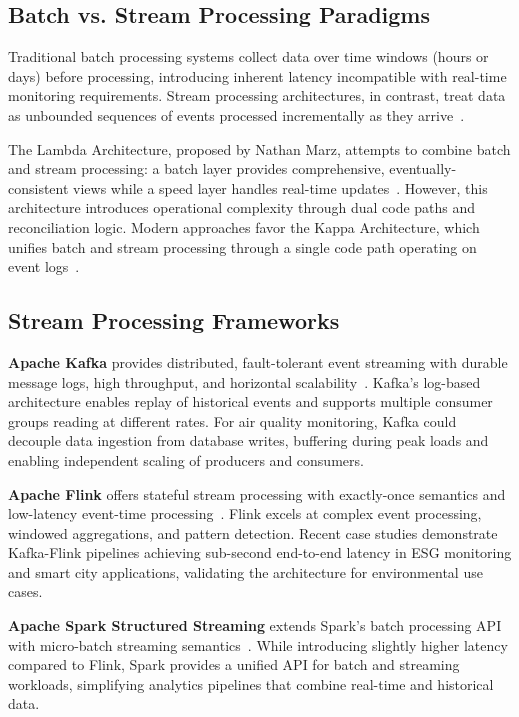 \subsection{Batch vs. Stream Processing Paradigms}
\label{subsec:lit_paradigms}

Traditional batch processing systems collect data over time windows (hours or days) before processing, introducing inherent latency incompatible with real-time monitoring requirements. Stream processing architectures, in contrast, treat data as unbounded sequences of events processed incrementally as they arrive~\citep{wiley}.

The Lambda Architecture, proposed by Nathan Marz, attempts to combine batch and stream processing: a batch layer provides comprehensive, eventually-consistent views while a speed layer handles real-time updates~\citep{mdpi}. However, this architecture introduces operational complexity through dual code paths and reconciliation logic. Modern approaches favor the Kappa Architecture, which unifies batch and stream processing through a single code path operating on event logs~\citep{medium}.

\subsection{Stream Processing Frameworks}
\label{subsec:lit_frameworks}

\textbf{Apache Kafka} provides distributed, fault-tolerant event streaming with durable message logs, high throughput, and horizontal scalability~\citep{medium}. Kafka's log-based architecture enables replay of historical events and supports multiple consumer groups reading at different rates. For air quality monitoring, Kafka could decouple data ingestion from database writes, buffering during peak loads and enabling independent scaling of producers and consumers.

\textbf{Apache Flink} offers stateful stream processing with exactly-once semantics and low-latency event-time processing~\citep{esr}. Flink excels at complex event processing, windowed aggregations, and pattern detection. Recent case studies demonstrate Kafka-Flink pipelines achieving sub-second end-to-end latency in ESG monitoring and smart city applications, validating the architecture for environmental use cases.

\textbf{Apache Spark Structured Streaming} extends Spark's batch processing API with micro-batch streaming semantics~\citep{medium}. While introducing slightly higher latency compared to Flink, Spark provides a unified API for batch and streaming workloads, simplifying analytics pipelines that combine real-time and historical data.

